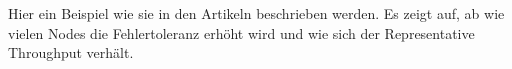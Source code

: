 \begin{flushleft}
    Hier ein Beispiel wie sie in den Artikeln \cite{UMIGLCCI, YDS7DTYM, V4XLXN7W} beschrieben werden.
    Es zeigt auf, ab wie vielen Nodes die Fehlertoleranz erhöht wird und wie sich der Representative Throughput verhält.
    \begin{table}[H]
    \caption{Quorum Beispiele}
    \label{tab:quorum-beispiele}
    \end{table}
\end{flushleft}